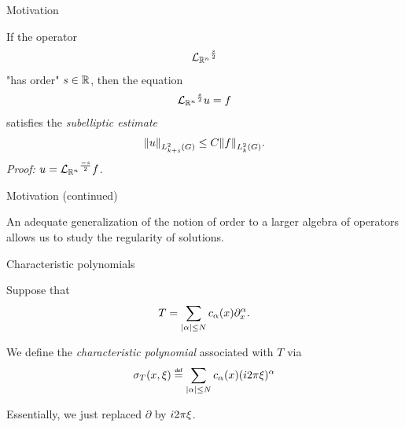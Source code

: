\documentclass[handout]{beamer}
\begin{document}
\begin{frame}
    {Motivation}

    If the operator
    \begin{align*}
        {\Laplacian [\R^n]}^\frac s 2
    \end{align*}
    "has order" $s \in \R$,
    \pause
    then the equation
    \begin{align*}
        {\Laplacian [\R^n]}^\frac s 2 u = f
    \end{align*}
    satisfies the \emph{subelliptic estimate}
    \begin{align*}
        \norm [\Sobolev {k + s}] u
        \leq C \norm [\Sobolev k] f.
    \end{align*}
    \pause
    \emph{Proof:} $u = {\Laplacian [\R^n]}^\frac {-s} 2 f$.
\end{frame}

\begin{frame}
    {Motivation (continued)}

    An adequate generalization of the notion of order to a larger algebra of operators allows us to study the regularity of solutions.
\end{frame}

\begin{frame}
    {Characteristic polynomials}

    \begin{definition}
        Suppose that
        \begin{align*}
            T =
            \sum_{\abs \alpha \leq N}
            c_\alpha(x)
            \iD{x^\alpha}.
        \end{align*}

        We define the \emph{characteristic polynomial}
        associated with $T$ via
        \begin{align*}
            \sigma_T(x, \xi) \defeq
            \sum_{\abs \alpha \leq N}
            c_\alpha(x)
            (\i \turn \xi)^\alpha
        \end{align*}
    \end{definition}

    \pause
    Essentially, we just replaced $\partial$ by $\i \turn \xi$.
\end{frame}
\end{document}
